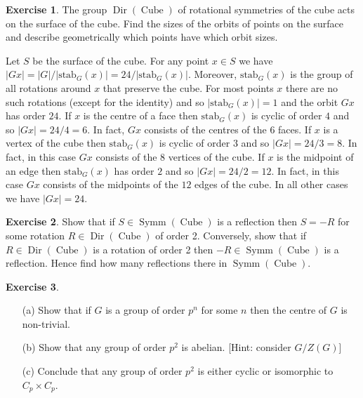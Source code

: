 \documentclass{amsart}
\DeclareMathOperator{\Dir}{Dir}
\DeclareMathOperator{\Symm}{Symm}
\DeclareMathOperator{\Cube}{Cube}
\renewcommand{\:}{\colon}
\theoremstyle{definition}
\newtheorem{exercise}{Exercise}
\newenvironment{solution}{{\noindent\bf Solution:}}{}
\begin{document}
\begin{exercise}
 The group $\Dir(\Cube)$ of rotational symmetries of the cube acts on the
 surface of the cube.  Find the sizes of the orbits of points on the surface
 and describe geometrically which points have which orbit sizes. 
\end{exercise}
\begin{solution}
 Let $S$ be the surface of the cube.  For any point $x\in S$ we have
 $|Gx|=|G|/|\text{stab}_G(x)|=24/|\text{stab}_G(x)|$.  Moreover,
 $\text{stab}_G(x)$ is the group of all rotations around $x$ that
 preserve the cube.  For most points $x$ there are no such rotations
 (except for the identity) and so $|\text{stab}_G(x)|=1$ and the orbit
 $Gx$ has order $24$.  If $x$ is the centre of a face then
 $\text{stab}_G(x)$ is cyclic of order $4$ and so $|Gx|=24/4=6$.  In
 fact, $Gx$ consists of the centres of the $6$ faces.  If $x$ is a
 vertex of the cube then $\text{stab}_G(x)$ is cyclic of order $3$ and
 so $|Gx|=24/3=8$.  In fact, in this case $Gx$ consists of the $8$
 vertices of the cube.  If $x$ is the midpoint of an edge then
 $\text{stab}_G(x)$ has order $2$ and so $|Gx|=24/2=12$.  In fact, in
 this case $Gx$ consists of the midpoints of the $12$ edges of the
 cube.  In all other cases we have $|Gx|=24$.
\end{solution}

\begin{exercise}
 Show that if $S\in\Symm(\Cube)$ is a reflection then $S =-R$ for some
 rotation $R\in\Dir(\Cube)$ of order 2.  Conversely, show that if
 $R\in\Dir(\Cube)$ is a rotation of order 2 then $-R\in\Symm(\Cube)$ is
 a reflection.  Hence find how many reflections there in
 $\Symm(\Cube)$.
\end{exercise}
\begin{solution}

\end{solution}

\begin{exercise}
 \begin{itemize}
 \item[(a)] Show that if $G$ is a group of order $p^n$ for some $n$
  then the centre of $G$ is non-trivial.
 \item[(b)] Show that any group of order $p^2$ is abelian. [Hint:
  consider $G/Z(G)$]
 \item[(c)] Conclude that any group of order $p^2$ is either cyclic or
  isomorphic to $C_p \times C_p$.
 \end{itemize}
\end{exercise}
\begin{solution}

\end{solution}
\end{document}
